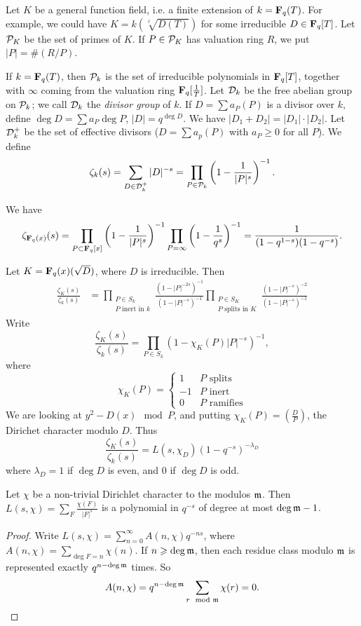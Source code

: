 Let $K$ be a general function field, i.e. a finite extension of 
$k=\mathbf{F}_q(T)$. For example, we could have 
$K=k(\sqrt[\ell]{D(T)})$ for some irreducible $D\in \mathbf{F}_q[T]$. Let 
$\mathcal{P}_K$ be the set of primes of $K$. If $P\in \mathcal{P}_K$ has valuation ring 
$R$, we put $|P| = \#(R/P)$. 

If $k=\mathbf{F}_q(T)$, then $\mathcal{P}_k$ is the set of irreducible polynomials in 
$\mathbf{F}_q[T]$, together with $\infty$ coming from the valuation ring 
$\mathbf{F}_q[\frac 1 T]$. Let $\mathcal{D}_k$ be the free abelian group on $\mathcal{P}_k$; we 
call $\mathcal{D}_k$ the \emph{divisor group} of $k$. If 
$D=\sum a_P(P)$ is a divisor over $k$, define $\deg D=\sum a_P \deg P$, 
$|D|=q^{\deg D}$. We have $|D_1+D_2|=|D_1|\cdot |D_2|$. Let 
$\mathcal{D}_k^+$ be the set of effective divisors ($D=\sum a_p(P)$ with 
$a_P\geq 0$ for all $P$). We define 
\[
  \zeta_k(s) = \sum_{D\in \mathcal{D}_k^+} |D|^{-s} = \prod_{P\in \mathcal{P}_k} \left(1-\frac{1}{|P|^s}\right)^{-1} .
\]

\begin{example}
We have 
\[
  \zeta_{\mathbf{F}_q(x)}(s) = \prod_{P\subset \mathbf{F}_q[x]}\left(1-\frac{1}{|P|^s}\right)^{-1} \prod_{P=\infty} \left(1-\frac{1}{q^s}\right)^{-1} = \frac{1}{(1-q^{1-s})(1-q^{-s})} .
\]
\end{example}

\begin{example}
Let $K=\mathbf{F}_q(x)(\sqrt{D})$, where $D$ is irreducible. Then 
\begin{align*}
  \frac{\zeta_K(s)}{\zeta_k(s)} 
    &= \prod_{\substack{P\in S_k \\P\text{ inert in $k$}}} \frac{(1-|P|^{-2 s})^{-1}}{(1-|P|^{-s})^{-1}}\prod_{\substack{P\in S_K \\ P\text{ splits in $K$}}} \frac{(1-|P|^{-s})^{-2}}{(1-|P|^{-s})^{-1}}
\end{align*}
Write 
\[
  \frac{\zeta_K(s)}{\zeta_k(s)} = \prod_{P\in S_k}(1-\chi_K(P)|P|^{-s})^{-1} ,
\]
where 
\[
  \chi_K(P) = \begin{cases} 1 & P\text{ splits} \\ -1 & P\text{ inert} \\ 0 & P\text{ ramifies} \end{cases}
\]
We are looking at $y^2-D(x)\mod P$, and putting $\chi_K(P)=\left(\frac{D}{P}\right)$, 
the Dirichet character modulo $D$. Thus 
\[
  \frac{\zeta_K(s)}{\zeta_k(s)} = L(s,\chi_D) (1-q^{-s})^{-\lambda_D} 
\]
where $\lambda_D=1$ if $\deg D$ is even, and $0$ if $\deg D$ is odd. 
\end{example}

\begin{theorem}
Let $\chi$ be a non-trivial Dirichlet character to the modulos $\mathfrak{m}$. Then 
$L(s,\chi) = \sum_F \frac{\chi(F)}{|F|^s}$ is a polynomial in $q^{-s}$ of degree 
at most $\deg\mathfrak{m}-1$. 
\end{theorem}
\begin{proof}
Write $L(s,\chi) = \sum_{n=0}^\infty A(n,\chi) q^{-n s}$, where 
$A(n,\chi) = \sum_{\deg F=n} \chi(n)$. If $n\geqslant \deg \mathfrak{m}$, then each residue 
class modulo $\mathfrak{m}$ is represented exactly $q^{n-\deg\mathfrak{m}}$ times. So 
\[
  A(n,\chi) = q^{n-\deg\mathfrak{m}} \sum_{r\mod {\mathfrak{m}}} \chi(r) = 0 .
\]
\end{proof}

